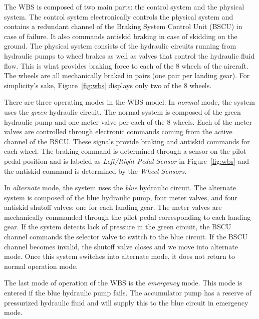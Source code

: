 The WBS is composed of two main parts: the control system and the physical system. The control system electronically controls the physical system and contains a redundant channel of the Braking System Control Unit (BSCU) in case of failure. It also commands antiskid braking in case of skidding on the ground. The physical system consists of the hydraulic circuits running from hydraulic pumps to wheel brakes as well as valves that control the hydraulic fluid flow. This is what provides braking force to each of the 8 wheels of the aircraft. The wheels are all mechanically braked in pairs (one pair per landing gear). For simplicity's sake, Figure~\ref{fig:wbs} displays only two of the 8 wheels. 

There are three operating modes in the WBS model. In \textit{normal} mode, the system uses the \textit{green} hydraulic circuit. The normal system is composed of the green hydraulic pump and one meter valve per each of the 8 wheels. Each of the meter valves are controlled through electronic commands coming from the active channel of the BSCU. These signals provide braking and antiskid commands for each wheel. The braking command is determined through a sensor on the pilot pedal position and is labeled as \textit{Left/Right Pedal Sensor} in Figure~\ref{fig:wbs} and the antiskid command is determined by the \textit{Wheel Sensors}. 

In \textit{alternate} mode, the system uses the \textit{blue} hydraulic circuit. The alternate system is composed of the blue hydraulic pump, four meter valves, and four antiskid shutoff valves: one for each landing gear. The meter valves are mechanically commanded through the pilot pedal corresponding to each landing gear. If the system detects lack of pressure in the green circuit, the BSCU channel commands the selector valve to switch to the blue circuit. %
If the BSCU channel becomes invalid, the shutoff valve closes and we move into alternate mode. Once this system switches into alternate mode, it does not return to normal operation mode.

The last mode of operation of the WBS is the \textit{emergency} mode. This mode is entered if the blue hydraulic pump fails. The accumulator pump has a reserve of pressurized hydraulic fluid and will supply this to the blue circuit in emergency mode.

